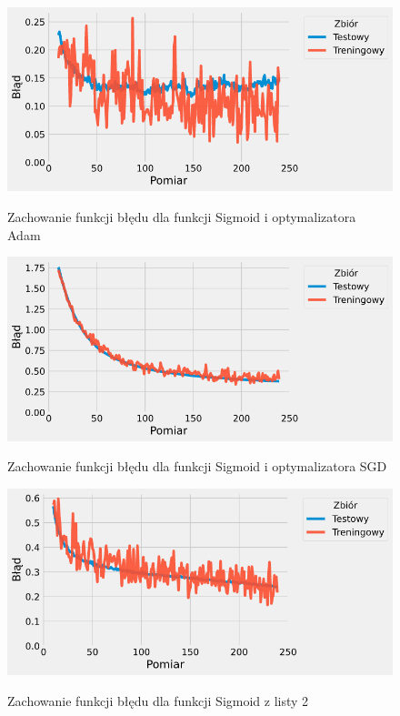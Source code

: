 \documentclass{article}
\begin{document}
\begin{figure}[H]
	\centering
	\caption{Zachowanie funkcji błędu dla funkcji Sigmoid i optymalizatora Adam}
	\includegraphics[width=\textwidth]{sig_adam_err.png}
	\label{fig:res116}
\end{figure}
\begin{figure}[H]
	\centering
	\caption{Zachowanie funkcji błędu dla funkcji Sigmoid i optymalizatora SGD}
	\includegraphics[width=\textwidth]{sig_sgd_err.png}
	\label{fig:res117}
\end{figure}
\begin{figure}[H]
	\centering
	\caption{Zachowanie funkcji błędu dla funkcji Sigmoid z listy 2}
	\includegraphics[width=\textwidth]{sig_2_err.png}
	\label{fig:res118}
\end{figure}
\end{document}
